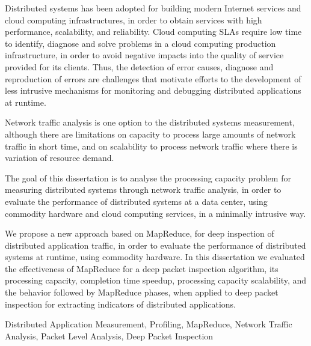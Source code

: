 Distributed systems has been adopted for building modern Internet services and cloud computing infrastructures, in order to obtain services with high performance, scalability, and reliability. Cloud computing SLAs require low time to identify, diagnose and solve problems in a cloud computing production infrastructure, in order to avoid negative impacts into the quality of service provided for its clients. Thus, the detection of error causes, diagnose and reproduction of errors are challenges that motivate efforts to the development of less intrusive mechanisms for monitoring and debugging distributed applications at runtime. 

Network traffic analysis is one option to the distributed systems measurement, although there are limitations on capacity to process large amounts of network traffic in short time, and on scalability to process network traffic where there is variation of resource demand.

The goal of this dissertation is to analyse the processing capacity problem for measuring distributed systems through network traffic analysis, in order to evaluate the performance of distributed systems at a data center, using commodity hardware and cloud computing services, in a minimally intrusive way. 

We propose a new approach based on MapReduce, for deep inspection of distributed application traffic, in order to evaluate the performance of distributed systems at runtime, using commodity hardware. In this dissertation we evaluated the effectiveness of MapReduce for a deep packet inspection algorithm, its processing capacity, completion time speedup, processing capacity scalability, and the behavior followed by MapReduce phases, when applied to deep packet inspection for extracting indicators of distributed applications.

\begin{keywords}
Distributed Application Measurement, Profiling, MapReduce, Network Traffic Analysis, Packet Level Analysis, Deep Packet Inspection
\end{keywords}